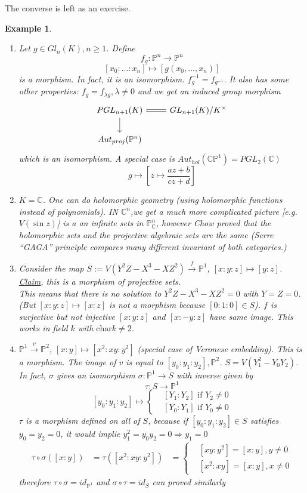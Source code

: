 \documentclass[11pt]{article}
\newtheorem{ex}[thm]{Example}
\newcommand{\proj}{\mathbb P}
\newcommand{\cplx}{\mathbb C}
\newcommand{\Lrta}{\Longrightarrow}
\newcommand{\lrta}{\longrightarrow}
\begin{document}
The converse is left as an exercise.

\begin{ex}
\begin{enumerate}[label=(\arabic*)]
\item Let $g\in Gl_n(K), n\geq 1$. Define 
$$
f_g:\proj^n\lrta \proj^n
$$
$$
[x_0:...:x_n]\longmapsto [g(x_0,...,x_n)]
$$
is a morphism. In fact, it is an isomorphism. $f^{-1}_g=f_{g^{-1}}$.
It also has some other properties: $f_{g}=f_{\lambda g},\lambda\neq 0$ and we get an induced group morphism
\[
\begin{tikzcd}
PGL_{n+1}(K) \arrow[d] \arrow[r, equal] & GL_{n+1}(K)/K^\times \\
Aut_{proj}(\proj^n) & 
\end{tikzcd}
\]
which is an isomorphism. A special case is $Aut_{hol}(\cplx \proj^1)=PGL_2(\cplx)$
$$
g\longmapsto \left[z\mapsto \frac{az+b}{cz+d}\right]
$$
\item  $K=\cplx$. One can do  holomorphic geometry (using holomorphic functions instead of polynomials). IN $\cplx^n$,we get a  much more complicated picture [e.g. $V(\sin z)$] is a an infinite sets in $\proj^n_\cplx$, however Chow proved that the holomorphic sets and the projective algebraic sets are the same (Serre ``GAGA'' principle compares many different invariant of both categories.)
\item Consider the map $S:=V(Y^2Z-X^3-XZ^2)\overset{f}{\lrta} \proj^1$, $[x:y:z]\mapsto [y:z]$. \\
\underline{Claim}, this is a morphism of projective sets.
\\
This means that there is no solution to $Y^2Z-X^3-XZ^2=0$ with $Y=Z=0$. (But $[x:y:z]\mapsto [x:z]$ is not a morphism because $[0:1:0]\in S$). $f$ is surjective but not injective $[x:y:z]$ and $[x:-y:z]$ have same image. This works in field $k$ with $\text{char} k\neq 2$.
\item $\proj^1\overset{v}{\lrta} \proj^2$, $[x:y]\mapsto [x^2:xy:y^2]$ (special case of Veronese embedding). This is a morphism. The image of $v$ is equal to $[y_0:y_1:y_2], \proj^2$. $S=V(Y_1^2-Y_0Y_2)$.  In fact, $\sigma$ gives an isomorphism
$\sigma: \proj^1\lrta S$ with inverse given by 
$$
\tau: S\lrta \proj^1
$$
$$
[y_0:y_1:y_2]\mapsto\left\{\begin{matrix*}
&[Y_1:Y_2] \text{ if } Y_2\neq 0\\
&[Y_0:Y_1]\text{ if } Y_0\neq 0
\end{matrix*}
\right.
$$
$\tau$ is a morphism defined on all of $S$, because if $[y_0:y_1:y_2]\in S$ satisfies $y_0=y_2=0$, it would implie $y^2_1=y_0y_2=0\Lrta y_1=0$ 
$$
\begin{aligned}
\tau\circ \sigma([x:y])&=\tau([x^2:xy:y^2])
&=\left\{\begin{matrix*}
&[xy:y^2]=[x:y], y\neq 0
\\
&[x^2:xy]=[x:y], x\neq 0
\end{matrix*}\right.
\end{aligned}
$$
therefore $\tau\circ \sigma= id_{\proj^1}$ and $\sigma\circ \tau=id_S$ can proved similarly


\end{enumerate}
\end{ex}
\end{document}
